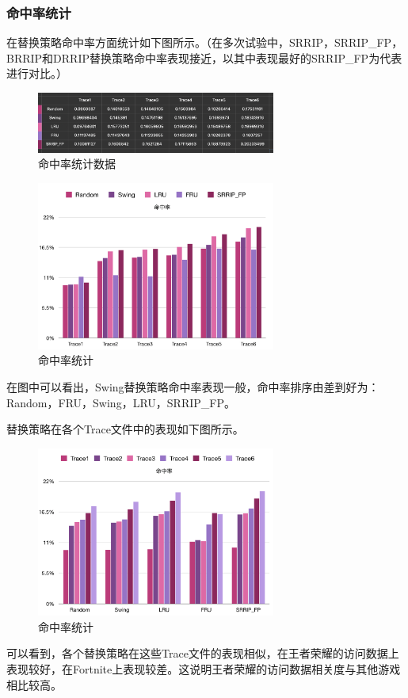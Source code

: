 \documentclass{article}
\begin{document}
\subsubsection{命中率统计}
在替换策略命中率方面统计如下图所示。（在多次试验中，SRRIP，SRRIP\_FP，BRRIP和DRRIP替换策略命中率表现接近，以其中表现最好的SRRIP\_FP为代表进行对比。）

\begin{figure}[H]
    \centering
    \includegraphics[width=0.7\textwidth]{pic11.png}
    \caption{命中率统计数据}
\end{figure}

\begin{figure}[H]
    \centering
    \includegraphics[width=0.7\textwidth]{pic6.png}
    \caption{命中率统计}
\end{figure}
在图中可以看出，Swing替换策略命中率表现一般，命中率排序由差到好为：Random，FRU，Swing，LRU，SRRIP\_FP。

替换策略在各个Trace文件中的表现如下图所示。
\begin{figure}[H]
    \centering
    \includegraphics[width=0.7\textwidth]{pic7.png}
    \caption{命中率统计}
\end{figure}
可以看到，各个替换策略在这些Trace文件的表现相似，在王者荣耀的访问数据上表现较好，在Fortnite上表现较差。这说明王者荣耀的访问数据相关度与其他游戏相比较高。
\end{document}
